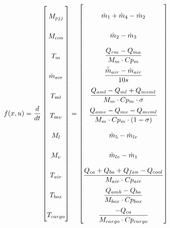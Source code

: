 \begin{equation} \label{eq:f_noSub} \renewcommand{\arraystretch}{2.4}
	f(x,u) =  \dfrac{d}{dt} \begin{bmatrix}
		M_{pjj}			\\				%
		M_{con} 		\\				%
		T_m 			\\				%
		\dot{m}_{air}	\\				%
		T_{ml}			\\				%
		T_{mv}			\\				%
		M_l				\\				%
		M_v				\\				%
		T_{air}			\\				%
		T_{box}			\\				%
		T_{cargo}		\\				%
		
	\end{bmatrix}
	=
	\begin{bmatrix}
		\dot{m}_1 + \dot{m}_4 - \dot{m}_2 \\										%
		\dot{m}_{2} - \dot{m}_{3}	\\												%
		\dfrac{Q_{rm} - Q_{ma}}{M_m \cdot Cp_m} \\									%
		\dfrac{\bar{\dot{m}}_{air}  - \dot{m}_{air}} {10s}		\\					%
		\dfrac{Q_{aml}-Q_{ml} + Q_{mvml}}{M_m \cdot Cp_m \cdot \sigma}        \\	%
		\dfrac{Q_{amv} - Q_{mv} - Q_{mvml}}{M_m \cdot Cp_m \cdot (1- \sigma)}	\\	%
		\dot{m}_{5} - \dot{m}_{lv}		\\											%
		\dot{m}_{lv} - \dot{m}_{1}	\\												%
		\dfrac{Q_{ca} + Q_{ba} + Q_{fan} -Q_{cool}}{M_{air} \cdot Cp_{air}} \\		%
		\dfrac{Q_{amb} - Q_{ba}}{M_{box} \cdot Cp_{box}} \\							%
		\dfrac{-Q_{ca}}{M_{cargo} \cdot Cp_{cargo}}									%
	\end{bmatrix}	
\end{equation}






